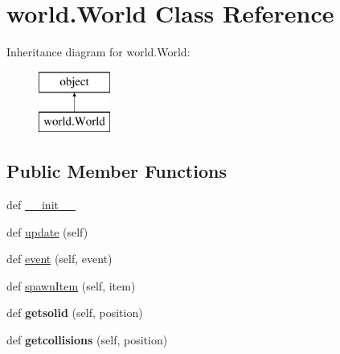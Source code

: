 \hypertarget{classworld_1_1_world}{}\section{world.\+World Class Reference}
\label{classworld_1_1_world}
Inheritance diagram for world.\+World\+:\begin{figure}[H]
\begin{center}
\leavevmode
\includegraphics[height=2.000000cm]{classworld_1_1_world}
\end{center}
\end{figure}
\subsection*{Public Member Functions}
\begin{DoxyCompactItemize}
\item 
def \hyperlink{classworld_1_1_world_a4351253668240be9d3a0d5bc2f1aa18f}{\+\_\+\+\_\+init\+\_\+\+\_\+}
\item 
def \hyperlink{classworld_1_1_world_aa29a26c0428a86089df77ad1969f2bea}{update} (self)
\item 
def \hyperlink{classworld_1_1_world_a08d655c1879ed557721de4e83dcff351}{event} (self, event)
\item 
def \hyperlink{classworld_1_1_world_adcfacaddb2803daf47361ce61c4cb6ee}{spawn\+Item} (self, item)
\item 
\hypertarget{classworld_1_1_world_a10176cae26a716121fe432aeabaade88}{}def {\bfseries getsolid} (self, position)\label{classworld_1_1_world_a10176cae26a716121fe432aeabaade88}

\item 
\hypertarget{classworld_1_1_world_a8aa1e4fb1d65f6b94112f2ad5ba96cb4}{}def {\bfseries getcollisions} (self, position)\label{classworld_1_1_world_a8aa1e4fb1d65f6b94112f2ad5ba96cb4}

\end{DoxyCompactItemize}
